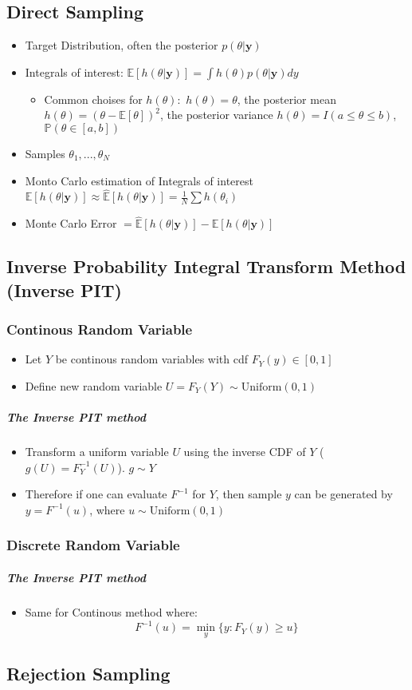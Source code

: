 \documentclass[12pt]{article}
\theoremstyle{definition}
\newcommand{\Prob}[1]{\mathbb{P}(#1)}
\newcommand{\Expect}[1]{\mathbb{E}\left[#1\right]}
\newcommand{\MonteCarlo}[1]{\hat{\mathbb{E}}\left[#1\right]}
\begin{document}
\subsection*{Direct Sampling}
\begin{itemize}
    \item Target Distribution, often the posterior $p(\theta|\bm{y})$
    \item Integrals of interest: $\Expect{h(\theta|\bm{y})} = \int h(\theta)p(\theta|\bm{y}) dy$
    \begin{itemize}[topsep = 0pt]
        \item Common choises for $h(\theta):$
         \subitem $h(\theta) = \theta$, the posterior mean
         \subitem $h(\theta) = (\theta - \Expect{\theta})^2$, the posterior variance
         \subitem $h(\theta) = I(a \leq \theta \leq b)$, $\Prob{\theta \in [a,b]}$
    \end{itemize}
    \item Samples $\theta_1,...,\theta_N$
    \item Monto Carlo estimation of Integrals of interest $\Expect{h(\theta| \bm{y})} \approx \MonteCarlo{h(\theta| \bm{y})} = \frac{1}{N}\sum h(\theta_i)$
    \item Monte Carlo Error $= \MonteCarlo{h(\theta|\bm{y})} - \Expect{h(\theta|\bm{y})}$ 
\end{itemize}

\subsection*{Inverse Probability Integral Transform Method (Inverse PIT)}
\subsubsection*{Continous Random Variable}
    \begin{itemize}
        \item Let $Y$ be continous random variables with cdf $F_Y(y) \in  [0,1]$
        \item Define new random variable $U = F_Y(Y) \sim \text{Uniform}(0,1)$
    \end{itemize}
    \subparagraph*{The Inverse PIT method}
    \begin{itemize}
        \item Transform a uniform variable $U$ using the inverse CDF of $Y$ ($g(U) = F_Y^{-1}(U)$). $g \sim Y$
        \item Therefore if one can evaluate $F^{-1}$ for $Y$, then sample $y$ can be generated by $y = F^{-1}(u)$, where $u \sim \text{Uniform}(0,1)$
    \end{itemize}
\subsubsection*{Discrete Random Variable}
    \subparagraph*{The Inverse PIT method}
    \begin{itemize}
        \item Same for Continous method where:$$F^{-1}(u) = \min_y\{y:F_Y(y)\geq u\}$$
    \end{itemize} 

\newpage
\subsection*{Rejection Sampling}
\end{document}
